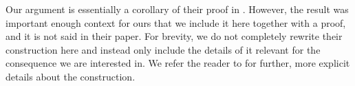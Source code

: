 \documentclass[centering,11pt,reqno]{amsart}
\newtheorem{theorem}{Theorem}[section]
\theoremstyle{definition}
\begin{document}
Our argument is essentially a corollary of their proof in  \cite{RockExtensions}. However, the result was important enough context for ours that we include it here together with a proof, and it is not said in their paper. For brevity, we do not completely rewrite their construction here and instead only include the details of it relevant for the consequence we are interested in. We refer the reader to \cite{RockExtensions} for further, more explicit details about the construction.

\end{document}
